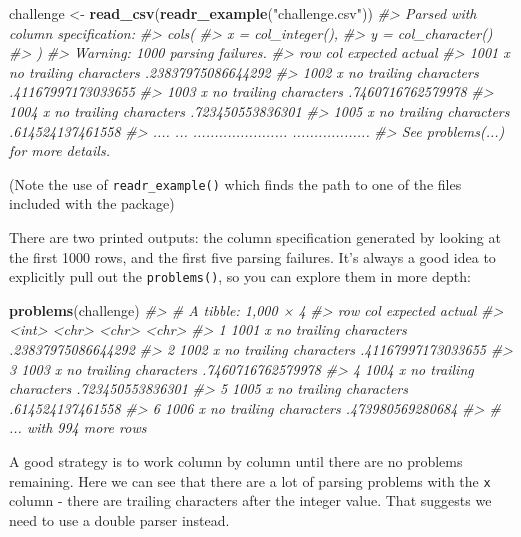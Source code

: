 \documentclass[]{book}
\newenvironment{Shaded}{\begin{snugshade}}{\end{snugshade}}
\newcommand{\KeywordTok}[1]{\textcolor[rgb]{0.13,0.29,0.53}{\textbf{{#1}}}}
\newcommand{\StringTok}[1]{\textcolor[rgb]{0.31,0.60,0.02}{{#1}}}
\newcommand{\CommentTok}[1]{\textcolor[rgb]{0.56,0.35,0.01}{\textit{{#1}}}}
\newcommand{\NormalTok}[1]{{#1}}
\begin{document}
\begin{Shaded}
\begin{Highlighting}[]
\NormalTok{challenge <-}\StringTok{ }\KeywordTok{read_csv}\NormalTok{(}\KeywordTok{readr_example}\NormalTok{(}\StringTok{"challenge.csv"}\NormalTok{))}
\CommentTok{#> Parsed with column specification:}
\CommentTok{#> cols(}
\CommentTok{#>   x = col_integer(),}
\CommentTok{#>   y = col_character()}
\CommentTok{#> )}
\CommentTok{#> Warning: 1000 parsing failures.}
\CommentTok{#>  row col               expected             actual}
\CommentTok{#> 1001   x no trailing characters .23837975086644292}
\CommentTok{#> 1002   x no trailing characters .41167997173033655}
\CommentTok{#> 1003   x no trailing characters .7460716762579978 }
\CommentTok{#> 1004   x no trailing characters .723450553836301  }
\CommentTok{#> 1005   x no trailing characters .614524137461558  }
\CommentTok{#> .... ... ...................... ..................}
\CommentTok{#> See problems(...) for more details.}
\end{Highlighting}
\end{Shaded}

(Note the use of \texttt{readr\_example()} which finds the path to one
of the files included with the package)

There are two printed outputs: the column specification generated by
looking at the first 1000 rows, and the first five parsing failures.
It's always a good idea to explicitly pull out the \texttt{problems()},
so you can explore them in more depth:

\begin{Shaded}
\begin{Highlighting}[]
\KeywordTok{problems}\NormalTok{(challenge)}
\CommentTok{#> # A tibble: 1,000 × 4}
\CommentTok{#>     row   col               expected             actual}
\CommentTok{#>   <int> <chr>                  <chr>              <chr>}
\CommentTok{#> 1  1001     x no trailing characters .23837975086644292}
\CommentTok{#> 2  1002     x no trailing characters .41167997173033655}
\CommentTok{#> 3  1003     x no trailing characters  .7460716762579978}
\CommentTok{#> 4  1004     x no trailing characters   .723450553836301}
\CommentTok{#> 5  1005     x no trailing characters   .614524137461558}
\CommentTok{#> 6  1006     x no trailing characters   .473980569280684}
\CommentTok{#> # ... with 994 more rows}
\end{Highlighting}
\end{Shaded}

A good strategy is to work column by column until there are no problems
remaining. Here we can see that there are a lot of parsing problems with
the \texttt{x} column - there are trailing characters after the integer
value. That suggests we need to use a double parser instead.
\end{document}
